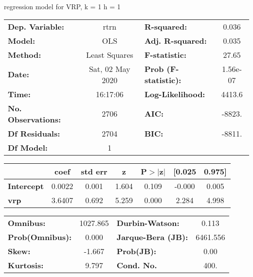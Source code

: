 regression model for VRP, k = 1 h = 1\begin{center}
\begin{tabular}{lclc}
\toprule
\textbf{Dep. Variable:}    &       rtrn       & \textbf{  R-squared:         } &     0.036   \\
\textbf{Model:}            &       OLS        & \textbf{  Adj. R-squared:    } &     0.035   \\
\textbf{Method:}           &  Least Squares   & \textbf{  F-statistic:       } &     27.65   \\
\textbf{Date:}             & Sat, 02 May 2020 & \textbf{  Prob (F-statistic):} &  1.56e-07   \\
\textbf{Time:}             &     16:17:06     & \textbf{  Log-Likelihood:    } &    4413.6   \\
\textbf{No. Observations:} &        2706      & \textbf{  AIC:               } &    -8823.   \\
\textbf{Df Residuals:}     &        2704      & \textbf{  BIC:               } &    -8811.   \\
\textbf{Df Model:}         &           1      & \textbf{                     } &             \\
\bottomrule
\end{tabular}
\begin{tabular}{lcccccc}
                   & \textbf{coef} & \textbf{std err} & \textbf{z} & \textbf{P$> |$z$|$} & \textbf{[0.025} & \textbf{0.975]}  \\
\midrule
\textbf{Intercept} &       0.0022  &        0.001     &     1.604  &         0.109        &       -0.000    &        0.005     \\
\textbf{vrp}       &       3.6407  &        0.692     &     5.259  &         0.000        &        2.284    &        4.998     \\
\bottomrule
\end{tabular}
\begin{tabular}{lclc}
\textbf{Omnibus:}       & 1027.865 & \textbf{  Durbin-Watson:     } &    0.113  \\
\textbf{Prob(Omnibus):} &   0.000  & \textbf{  Jarque-Bera (JB):  } & 6461.556  \\
\textbf{Skew:}          &  -1.667  & \textbf{  Prob(JB):          } &     0.00  \\
\textbf{Kurtosis:}      &   9.797  & \textbf{  Cond. No.          } &     400.  \\
\bottomrule
\end{tabular}
\end{center}

